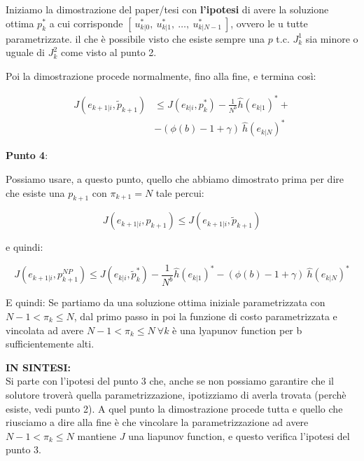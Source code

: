 \documentclass[12pt]{article}
\begin{document}
Iniziamo la dimostrazione del paper/tesi con \textbf{l'ipotesi} di avere la soluzione ottima $p_k^*$ a cui corrisponde $[\ u_{k|0}^*,\ u_{k|1}^*,\  \dots,\  u_{k|{N-1}}^*\ ]$, ovvero le u tutte parametrizzate. il che è possibile visto che esiste sempre una $p$ t.c. $J_k^1$ sia minore o uguale di $J_k^2$ come visto al punto 2. 

Poi la dimostrazione procede normalmente, fino alla fine, e termina così:

\begin{equation*}
    \begin{split}
        J({e}_{k+1|i},\tilde{p}_{k+1})&\le J({e}_{k|i},p_{k}^*) - \frac{1}{N^b}\hat{h}(e_{k|1})^*+ \\ 
            &-(\phi(b)-1+\gamma)\ \hat{h}(e_{k|N})^*
    \end{split}
\end{equation*}

\textbf{Punto 4}:

Possiamo usare, a questo punto, quello che abbiamo dimostrato prima per dire che esiste una $p_{k+1}$ con $\pi_{k+1} = N$ tale percui:

\begin{equation}
	J({e}_{k+1|i},p_{k+1}) \leq J({e}_{k+1|i},\tilde{p}_{k+1})
\end{equation}

e quindi: 

\begin{equation}
	J({e}_{k+1|i},p^{NP}_{k+1}) \leq J({e}_{k|i},\tilde{p}_k^*)- \frac{1}{N^b}\hat{h}(e_{k|1})^*-(\phi(b)-1+\gamma)\ \hat{h}(e_{k|N})^*
\end{equation}

E quindi: 
Se partiamo da una soluzione ottima iniziale parametrizzata con $N-1 < \pi_k \leq N$, dal primo passo in poi la funzione di costo parametrizzata e vincolata ad avere $N-1 < \pi_k \leq N\  \forall k$ è una lyapunov function per b sufficientemente alti.

\textbf{IN SINTESI:}\\
Si parte con l'ipotesi del punto 3 che, anche se non possiamo garantire che il solutore troverà quella parametrizzazione, ipotizziamo di averla trovata (perchè esiste, vedi punto 2). A quel punto la dimostrazione procede tutta e quello che riusciamo a dire alla fine è che vincolare la parametrizzazione ad avere $N-1 < \pi_k \leq N$ mantiene $J$ una liapunov function, e questo verifica l'ipotesi del punto 3.
\end{document}
